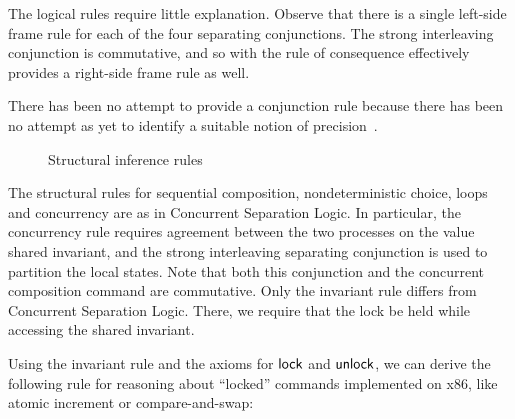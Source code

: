 \documentclass[11pt]{report}
\begin{document}
The logical rules require little explanation. Observe that there is a single left-side frame rule for each of the four separating conjunctions. The strong interleaving conjunction is commutative, and so with the rule of consequence effectively provides a right-side frame rule as well. 

There has been no attempt to provide a conjunction rule because there has been no attempt as yet to identify a suitable notion of precision~\cite{DBLP:journals/entcs/GotsmanBC11}. 

\begin{figure}[ht]
	\centering
	\caption{\label{fig:structural-inference-rules}Structural inference rules}
\end{figure}

The structural rules for sequential composition, nondeterministic choice, loops and concurrency are as in Concurrent Separation Logic. In particular, the concurrency rule requires agreement between the two processes on the value shared invariant, and the strong interleaving separating conjunction is used to partition the local states. Note that both this conjunction and the concurrent composition command are commutative. Only the invariant rule differs from Concurrent Separation Logic. There, we require that the lock be held while accessing the shared invariant. 

Using the invariant rule and the axioms for $\operatorname{\mathsf{lock}}$ and $\operatorname{\mathsf{unlock}}$, we can derive the following rule for reasoning about ``locked'' commands implemented on x86, like atomic increment or compare-and-swap: 
\end{document}
